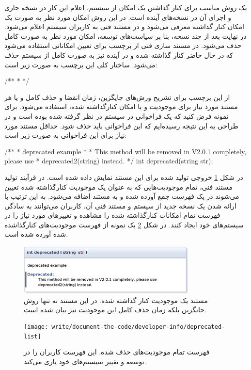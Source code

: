 یک روش مناسب برای کنار گذاشتن یک امکان از سیستم، اعلام این کار در نسخه جاری و
اجرای آن در نسخه‌های آینده است.
در این روش امکان مورد نظر به صورت یک امکان کنار گذاشته معرفی می‌شود و در مستند
فنی به کاربران سیستم اعلام می‌شود.
در نهایت بعد از چند نسخه، بنا بر سیاست‌های توسعه، امکان مورد نظر به صورت کامل
حذف می‌شود.
در مستند سازی فنی از برچسب  برای تعیین امکاناتی استفاده می‌شود که
در حال حاضر کنار گذاشته شده و در آینده نیز به صورت کامل از سیستم حذف می‌شود.
ساختار کلی این برچسب به صورت زیر است:
\begin{C++}
/**
 * 
 */
\end{C++} 

از این برچسب برای تشریح ورش‌های جایگزین، زمان انقضا و حذف کامل و یا هر مستند
مورد نیاز برای موجودیت و یا امکان کنارگذاشته شده، استفاده می‌شود.
برای نمونه فرض کنید که یک فراخوانی در سیستم در نظر گرفته شده بوده است و در
طراحی به این نتیجه رسیده‌ایم که این فراخوانی باید حذف شود.
حداقل مستند مورد نیاز برای این فراخوانی به صورت زیر است:
\begin{C++}
/**
 * \brief deprecated example
 *
 * \deprecated This method will be removed in V2.0.1 completely, please use
 * deprecated2(string) instead.
 */
int deprecated(string str);
\end{C++}

در شکل \ref{write/document-the-code/developer-info/deprecated} خروجی تولید شده
برای این مستند نمایش داده شده است.
در فرآیند تولید مستند فنی، تمام موجودیت‌هایی که به عنوان یک موجودیت کنارگذاشته
شده تعیین می‌شوند در یک فهرست جمع آورده شده و به مستند اضافه می‌شود.
به این ترتیب با ارائه شدن یک نسخه جدید از سیستم و مستند فنی آن، کاربران
می‌توانند به سادگی فهرست تمام امکانات کنارگذاشته شده را مشاهده و تغییرهای مورد
نیاز را در سیستم‌های خود ایجاد کنند.
در شکل \ref{write/document-the-code/developer-info/deprecated-list} یک نمونه از
فهرست موجودیت‌های کنارگذاشده شده آورده شده است.
\begin{figure}
	\centering
	\includegraphics[width=0.8\textwidth]{image/write/document-the-code/developer-info/deprecated}
	\caption[موجودیت کنار گذاشته شده]{
		مستند یک موجودیت کنار گذاشته شده. در این مستند نه تنها روش جایگزین بلکه زمان
		حذف کامل این موجودیت نیز بیان شده است.
	}
	\label{write/document-the-code/developer-info/deprecated}
\end{figure}
\begin{figure}
	\centering
	\texttt{[image: write/document-the-code/developer-info/deprecated-list]}
	\caption[فهرست موجودیت‌های کنار گذاشته شده]{
		فهرست تمام موجودیت‌های حذف شده. این فهرست کاربران را در توسعه و تغییر سیستم‌های خود
		یاری می‌کند.
	}
	\label{write/document-the-code/developer-info/deprecated-list}
\end{figure}


